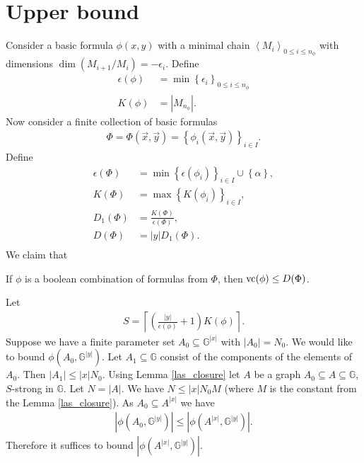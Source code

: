 \documentclass{amsart}
\newcommand{\GG}{\mathbb G}
\newcommand{\GGY}{\GG^{|y|}}
\newcommand{\AX}{A^{|x|}}
\newcommand{\curly}[1]{\left\{#1\right\}}
\newcommand{\paren}[1]{\left(#1\right)}
\newcommand{\abs}[1]{\left|#1\right|}
\newcommand{\agl}[1]{\left\langle #1 \right\rangle}
\begin{document}

\section{Upper bound}

Consider a basic formula $\phi(x,y)$ with a minimal chain  $\agl{M_i}_{0 \leq i \leq n_{\phi}}$ with dimensions  $\dim(M_{i+1}/M_i) = -\epsilon_i$.
Define
\begin{align*}
  \epsilon(\phi) &= \min \curly{\epsilon_i}_{0 \leq i \leq n_\phi}\\
  K(\phi) &= |M_{n_\phi}|.
\end{align*}
Now consider a finite collection of basic formulas
\begin{align*}
  \Phi = \Phi(\vec x, \vec y) = \curly{\phi_i(\vec x, \vec y)}_{i\in I}.
\end{align*}
Define
\begin{align*}
  \epsilon(\Phi) &= \min \curly{\epsilon(\phi_i)}_{i \in I} \cup \curly{\alpha}, \\
  K(\Phi) &= \max \curly{K(\phi_i)}_{i \in I},\\
  D_1(\Phi) &= \frac{K(\Phi)}{\epsilon(\Phi)}, \\
  D(\Phi) &= |y| D_1(\Phi).\\
\end{align*}
We claim that
\begin{Theorem} \label{upper}
  If $\phi$ is a boolean combination of formulas from $\Phi$, then $\operatorname{vc}(\phi) \leq D(\Phi)$.
\end{Theorem}
Let
\begin{align*}
  S = \left\lceil{\paren{\frac{|y|}{\epsilon(\phi)} + 1} K(\phi)}\right\rceil.
\end{align*}
Suppose we have a finite parameter set $A_0 \subseteq \GG^{|x|}$ with $|A_0| = N_0$.
We would like to bound $\phi(A_0, \GGY)$.
Let $A_1 \subseteq \GG$ consist of the components of the elements of $A_0$.
Then $|A_1| \leq |x| N_0$.
Using Lemma \ref{las_closure} let $A$ be a graph $A_0 \subseteq A \subseteq \GG$, $S$-strong in $\GG$.
Let $N = |A|$.
We have $N \leq |x| N_0 M$ (where $M$ is the constant from the Lemma \ref{las_closure}).
As $A_0 \subseteq \AX$ we have
\begin{align*}
  \abs{\phi(A_0, \GGY)} \leq \abs{\phi(\AX, \GGY)}.
\end{align*}
Therefore it suffices to bound $\abs{\phi(\AX, \GGY)}$.
\end{document}
